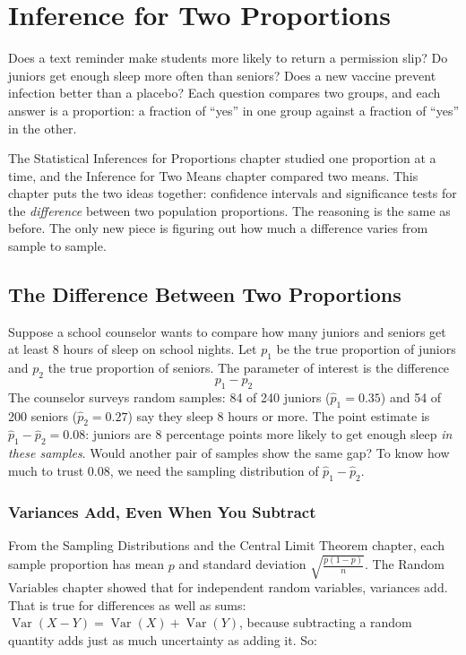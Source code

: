\chapter{Inference for Two Proportions}

Does a text reminder make students more likely to return a permission slip? Do
juniors get enough sleep more often than seniors? Does a new vaccine prevent
infection better than a placebo? Each question compares two groups, and each answer
is a proportion: a fraction of ``yes'' in one group against a fraction of ``yes'' in
the other.

The Statistical Inferences for Proportions chapter studied one proportion at a time,
and the Inference for Two Means chapter compared two means. This chapter puts
the two ideas together: confidence intervals and significance tests for the
\emph{difference} between two population proportions. The reasoning is the same as
before. The only new piece is figuring out how much a difference varies from sample
to sample.

\section{The Difference Between Two Proportions}
Suppose a school counselor wants to compare how many juniors and seniors get at least 8
hours of sleep on school nights. Let $p_1$ be the true proportion of juniors and $p_2$ the
true proportion of seniors. The parameter of interest is the difference
$$p_1 - p_2$$
The counselor surveys random samples: 84 of 240 juniors ($\hat{p}_1 = 0.35$) and 54 of 200
seniors ($\hat{p}_2 = 0.27$) say they sleep 8 hours or more. The point estimate is
$\hat{p}_1 - \hat{p}_2 = 0.08$: juniors are 8 percentage points more likely to get enough sleep
\emph{in these samples}. Would another pair of samples show the same gap? To know how much
to trust 0.08, we need the sampling distribution of $\hat{p}_1 - \hat{p}_2$.

\subsection{Variances Add, Even When You Subtract}
From the Sampling Distributions and the Central Limit Theorem chapter, each sample
proportion has mean $p$ and standard deviation $\sqrt{\frac{p(1-p)}{n}}$. The Random
Variables chapter showed that for independent random variables, variances add. That is
true for differences as well as sums: $\operatorname{Var}(X - Y) = \operatorname{Var}(X) + \operatorname{Var}(Y)$,
because subtracting a random quantity adds just as much uncertainty as adding it. So:

